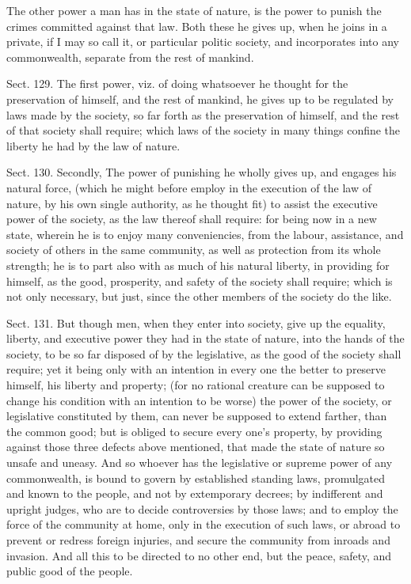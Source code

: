 \documentclass[11pt,openany]{book}
\begin{document}
The other power a man has in the state of nature, is the power to punish the crimes committed against that law. Both these he gives up, when he joins in a private, if I may so call it, or particular politic society, and incorporates into any commonwealth, separate from the rest of mankind.

Sect. 129. The first power, viz. of doing whatsoever he thought for the preservation of himself, and the rest of mankind, he gives up to be regulated by laws made by the society, so far forth as the preservation of himself, and the rest of that society shall require; which laws of the society in many things confine the liberty he had by the law of nature.

Sect. 130. Secondly, The power of punishing he wholly gives up, and engages his natural force, (which he might before employ in the execution of the law of nature, by his own single authority, as he thought fit) to assist the executive power of the society, as the law thereof shall require: for being now in a new state, wherein he is to enjoy many conveniencies, from the labour, assistance, and society of others in the same community, as well as protection from its whole strength; he is to part also with as much of his natural liberty, in providing for himself, as the good, prosperity, and safety of the society shall require; which is not only necessary, but just, since the other members of the society do the like.

Sect. 131. But though men, when they enter into society, give up the equality, liberty, and executive power they had in the state of nature, into the hands of the society, to be so far disposed of by the legislative, as the good of the society shall require; yet it being only with an intention in every one the better to preserve himself, his liberty and property; (for no rational creature can be supposed to change his condition with an intention to be worse) the power of the society, or legislative constituted by them, can never be supposed to extend farther, than the common good; but is obliged to secure every one's property, by providing against those three defects above mentioned, that made the state of nature so unsafe and uneasy. And so whoever has the legislative or supreme power of any commonwealth, is bound to govern by established standing laws, promulgated and known to the people, and not by extemporary decrees; by indifferent and upright judges, who are to decide controversies by those laws; and to employ the force of the community at home, only in the execution of such laws, or abroad to prevent or redress foreign injuries, and secure the community from inroads and invasion. And all this to be directed to no other end, but the peace, safety, and public good of the people.
\end{document}
